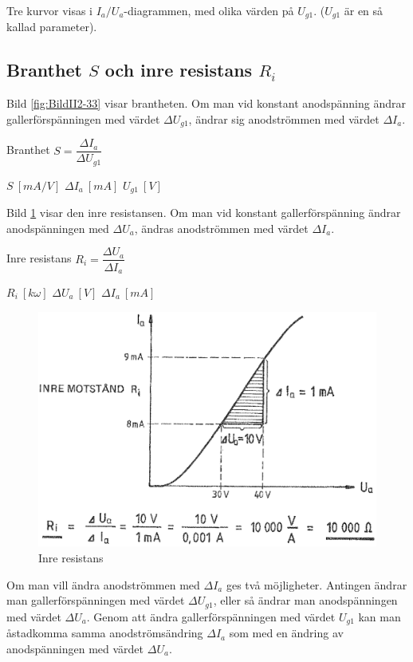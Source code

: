 Tre kurvor visas i \(I_a/U_a\)-diagrammen, med olika värden på
\(U_{g1}\). (\(U_{g1}\) är en så kallad parameter).

\subsection{Branthet $S$ och inre resistans $R_i$}

Bild \ref{fig:BildII2-33} visar brantheten.
Om man vid konstant anodspänning ändrar gallerförspänningen med värdet
\(\Delta U_{g1}\), ändrar sig anodströmmen med värdet \(\Delta I_a\).

Branthet \(S = \dfrac{\Delta I_a}{\Delta U_{g1}}\)

\(S\ [mA/V]\) \(\Delta I_a\ [mA]\) \(U_{g1}\ [V]\)

Bild \ref{fig:BildII2-34} visar den inre resistansen.
Om man vid konstant gallerförspänning ändrar anodspänningen med
\(\Delta U_a\), ändras anodströmmen med värdet \(\Delta I_a\).

Inre resistans \(R_i = \dfrac{\Delta U_a}{\Delta I_a}\)

\(R_i\ [k \omega]\)  \(\Delta U_a\ [V]\)  \(\Delta I_a\ [mA]\)

\begin{figure}[ht]
\includegraphics[width=\textwidth]{images/cropped_pdfs/bild_2_2-34.pdf}
\caption{Inre resistans}
\label{fig:BildII2-34}
\end{figure}

Om man vill ändra anodströmmen med \(\Delta I_a\) ges två möjligheter.
Antingen ändrar man gallerförspänningen med värdet \(\Delta U_{g1}\), eller så ändrar man  anodspänningen med värdet \(\Delta U_a\).
Genom att ändra gallerförspänningen med värdet \(U_{g1}\) kan man åstadkomma
samma anodströmsändring \(\Delta I_a\) som med en ändring av anodspänningen
med värdet \(\Delta U_a\).

